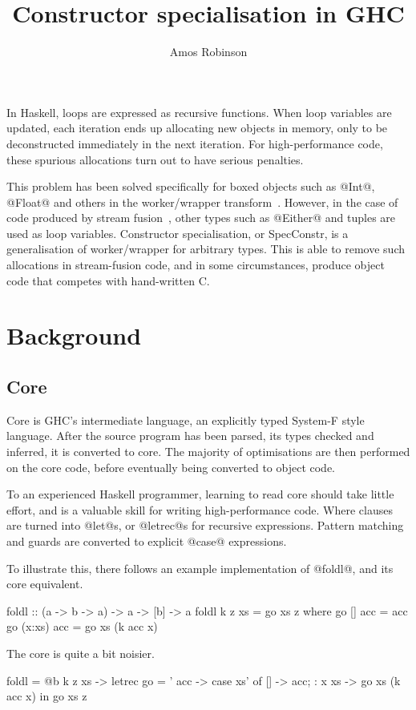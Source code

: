 \documentclass{tmr}
\title{Constructor specialisation in GHC}
\author{Amos Robinson\email{amosr@cse.unsw.edu.au}}
\begin{document}
\makeatactive

\begin{introduction}
In Haskell, loops are expressed as recursive functions. 
When loop variables are updated, each iteration ends up allocating new objects in memory, only to be deconstructed immediately in the next iteration.
For high-performance code, these spurious allocations turn out to have serious penalties.

This problem has been solved specifically for boxed objects such as @Int@, @Float@ and others in the worker/wrapper transform~\CITE.
However, in the case of code produced by stream fusion~\CITE, other types such as @Either@ and tuples are used as loop variables.
Constructor specialisation, or SpecConstr, is a generalisation of worker/wrapper for arbitrary types.
This is able to remove such allocations in stream-fusion code, and in some circumstances, produce object code that competes with hand-written C.
\end{introduction}

\section{Background}
\subsection{Core}
Core is GHC's intermediate language, an explicitly typed System-F style language.
After the source program has been parsed, its types checked and inferred, it is converted to core.
The majority of optimisations are then performed on the core code,
before eventually being converted to object code.

To an experienced Haskell programmer, learning to read core should take little effort, and is a valuable skill for writing high-performance code.
Where clauses are turned into @let@s, or @letrec@s for recursive expressions.
Pattern matching and guards are converted to explicit @case@ expressions.

To illustrate this, there follows an example implementation of @foldl@, and its core equivalent.
\begin{code}
foldl :: (a -> b -> a) -> a -> [b] -> a
foldl k z xs = go xs z
 where
  go []     acc = acc
  go (x:xs) acc = go xs (k acc x)
\end{code}

The core is quite a bit noisier.

\begin{code}
foldl = \@a @b k z xs ->
 letrec {
     go = \xs' acc ->
       case xs' of {
         []     -> acc;
         : x xs -> go xs (k acc x)
       }
 } in go xs z
\end{code}
\end{document}
